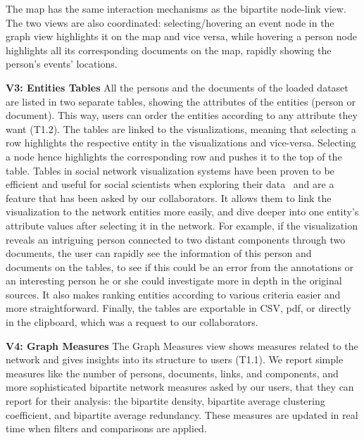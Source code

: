 The map has the same interaction mechanisms as the bipartite node-link view.
The two views are also coordinated: selecting/hovering an event node in the graph view highlights it on the map and vice versa, while hovering a person node highlights all its corresponding documents on the map, rapidly showing the person's events' locations.

\noindent\textbf{V3: Entities Tables}
All the persons and the documents of the loaded dataset are listed in two separate tables, showing the attributes of the entities (person or document).
This way, users can order the entities according to any attribute they want (T1.2).
The tables are linked to the visualizations, meaning that selecting a row highlights the respective entity in the visualizations and vice-versa.
Selecting a node hence highlights the corresponding row and pushes it to the top of the table.
Tables in social network visualization systems have been proven to be efficient and useful for social scientists when exploring their data~\cite{bezerianosGraphDiceSystemExploring2010} and are a feature that has been asked by our collaborators.
It allows them to link the visualization to the network entities more easily, and dive deeper into one entity's attribute values after selecting it in the network.
For example, if the visualization reveals an intriguing person connected to two distant components through two documents, the user can rapidly see the information of this person and documents on the tables, to see if this could be an error from the annotations or an interesting person he or she could investigate more in depth in the original sources.
It also makes ranking entities according to various criteria easier and more straightforward.
Finally, the tables are exportable in CSV, pdf, or directly in the clipboard, which was a request to our collaborators.



\noindent\textbf{V4: Graph Measures}
The Graph Measures view shows measures related to the network and gives insights into its structure to users (T1.1).
We report simple measures like the number of persons, documents, links, and components, and more sophisticated bipartite network measures asked by our users, that they can report for their analysis: the bipartite density, bipartite average clustering coefficient, and bipartite average redundancy\cite{latapyBasicNotionsAnalysis2008}.
These measures are updated in real time when filters and comparisons are applied.


